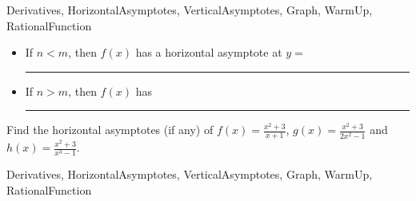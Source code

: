 \begin{tagblock}{Derivatives, HorizontalAsymptotes, VerticalAsymptotes, Graph, WarmUp, RationalFunction  }
\begin{question}
\begin{itemize}
\bigskip

\item If $n<m$, then $f(x)$ has a horizontal asymptote at $y = $ \rule{5cm}{0.1mm} 

\bigskip
\item If $n>m$, then $f(x)$ has \rule{8cm}{0.1mm} 
\bigskip

\end{itemize}



Find the horizontal asymptotes (if any) of $\displaystyle f(x) = \frac{x^2+3}{x+1}$,   $\displaystyle g(x) = \frac{x^2+3}{2x^2 - 1}$ and $\displaystyle h(x) = \frac{x^2+3}{x^3-1}$.



	
\begin{tags}
	   Derivatives, HorizontalAsymptotes, VerticalAsymptotes, Graph, WarmUp, RationalFunction
\end{tags}
	
\begin{diary}
\end{diary}
	
\begin{solution}
	   
\end{solution}
	
\end{question}

\end{tagblock}


